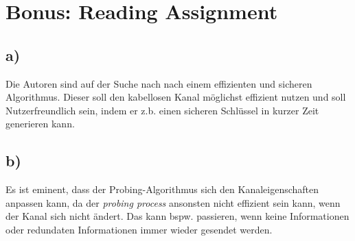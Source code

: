 \documentclass[12pt,a4paper]{article}
\begin{document}
\section{Bonus: Reading Assignment}
\subsection*{a)}
Die Autoren sind auf der Suche nach nach einem effizienten und sicheren Algorithmus. Dieser soll den kabellosen Kanal möglichst effizient nutzen und soll Nutzerfreundlich sein, indem er z.b. einen sicheren Schlüssel in kurzer Zeit generieren kann.

\subsection*{b)}
Es ist eminent, dass der Probing-Algorithmus sich den Kanaleigenschaften anpassen kann, da der \textit{probing process} ansonsten nicht effizient sein kann, wenn der Kanal sich nicht ändert. Das kann bspw. passieren, wenn keine Informationen oder redundaten Informationen immer wieder gesendet werden.

\end{document}
